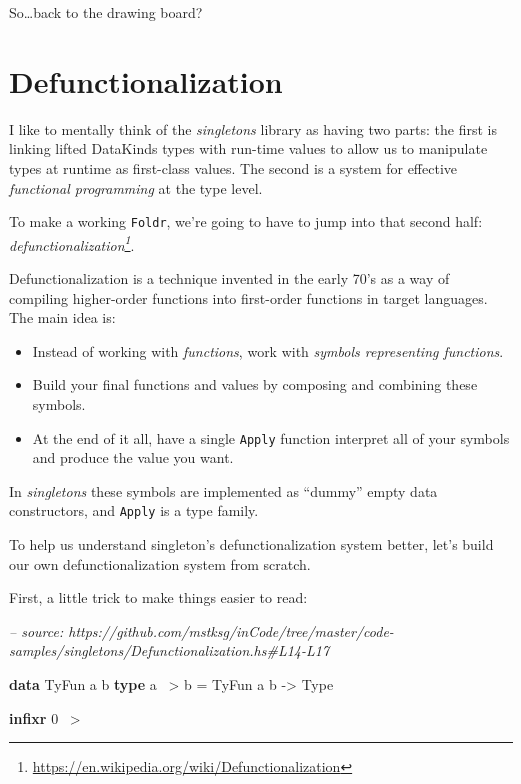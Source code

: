 \documentclass[]{article}
\newenvironment{Shaded}{}{}
\newcommand{\CommentTok}[1]{\textcolor[rgb]{0.38,0.63,0.69}{\textit{#1}}}
\newcommand{\DataTypeTok}[1]{\textcolor[rgb]{0.56,0.13,0.00}{#1}}
\newcommand{\DecValTok}[1]{\textcolor[rgb]{0.25,0.63,0.44}{#1}}
\newcommand{\FunctionTok}[1]{\textcolor[rgb]{0.02,0.16,0.49}{#1}}
\newcommand{\KeywordTok}[1]{\textcolor[rgb]{0.00,0.44,0.13}{\textbf{#1}}}
\newcommand{\NormalTok}[1]{#1}
\newcommand{\OtherTok}[1]{\textcolor[rgb]{0.00,0.44,0.13}{#1}}
\renewcommand{\href}[2]{#2\footnote{\url{#1}}}
\begin{document}
So\ldots{}back to the drawing board?

\hypertarget{defunctionalization}{%
\section{Defunctionalization}\label{defunctionalization}}

I like to mentally think of the \emph{singletons} library as having two parts:
the first is linking lifted DataKinds types with run-time values to allow us to
manipulate types at runtime as first-class values. The second is a system for
effective \emph{functional programming} at the type level.

To make a working \texttt{Foldr}, we're going to have to jump into that second
half:
\emph{\href{https://en.wikipedia.org/wiki/Defunctionalization}{defunctionalization}}.

Defunctionalization is a technique invented in the early 70's as a way of
compiling higher-order functions into first-order functions in target languages.
The main idea is:

\begin{itemize}
\tightlist
\item
  Instead of working with \emph{functions}, work with \emph{symbols representing
  functions}.
\item
  Build your final functions and values by composing and combining these
  symbols.
\item
  At the end of it all, have a single \texttt{Apply} function interpret all of
  your symbols and produce the value you want.
\end{itemize}

In \emph{singletons} these symbols are implemented as ``dummy'' empty data
constructors, and \texttt{Apply} is a type family.

To help us understand singleton's defunctionalization system better, let's build
our own defunctionalization system from scratch.

First, a little trick to make things easier to read:

\begin{Shaded}
\begin{Highlighting}[]
\CommentTok{-- source: https://github.com/mstksg/inCode/tree/master/code-samples/singletons/Defunctionalization.hs#L14-L17}

\KeywordTok{data} \DataTypeTok{TyFun}\NormalTok{ a b}
\KeywordTok{type}\NormalTok{ a }\FunctionTok{~>}\NormalTok{ b }\FunctionTok{=} \DataTypeTok{TyFun}\NormalTok{ a b }\OtherTok{->} \DataTypeTok{Type}

\KeywordTok{infixr} \DecValTok{0} \FunctionTok{~>}
\end{Highlighting}
\end{Shaded}
\end{document}
